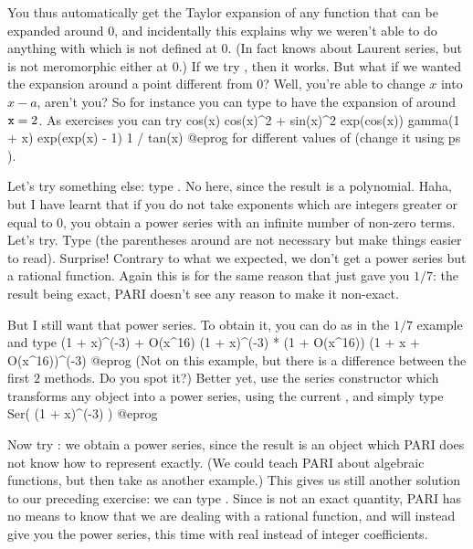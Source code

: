 You thus automatically get the Taylor expansion of any function that can be
expanded around $0$, and incidentally this explains why we weren't able to do
anything with  which is not defined at $0$. (In fact 
knows about Laurent series, but  is not meromorphic either at
$0$.) If we try , then it works. But what if we wanted the
expansion around a point different from 0? Well, you're able to change $x$
into $x-a$, aren't you? So for instance you can type  to have
the expansion of  around ${\tt x}=2$. As exercises you can try
\bprog
  cos(x)
  cos(x)^2 + sin(x)^2
  exp(cos(x))
  gamma(1 + x)
  exp(exp(x) - 1)
  1 / tan(x)
@eprog\noindent
for different values of  (change it using \b{ps}
).

Let's try something else: type . No  here, since
the result is a polynomial.  Haha, but I have learnt that if you do not take
exponents which are integers greater or equal to 0, you obtain a power series
with an infinite number of non-zero terms. Let's try.  Type
 (the parentheses around  are not necessary but
make things easier to read). Surprise! Contrary to what we expected, we don't
get a power series but a rational function. Again this is for the same reason
that  just gave you $1/7$: the result being exact, PARI doesn't see
any reason to make it non-exact.

But I still want that power series. To obtain it, you can do as in the $1/7$
example and type
\bprog
  (1 + x)^(-3) + O(x^16)
  (1 + x)^(-3) * (1 + O(x^16))
  (1 + x + O(x^16))^(-3)
@eprog\noindent
(Not on this example, but there is a difference between the first $2$
methods. Do you spot it?) Better yet, use the series constructor which
transforms any object into a power series, using the current
, and simply type
\bprog
  Ser( (1 + x)^(-3) )
@eprog

Now try : we obtain a power series, since the
result is an object which PARI does not know how to represent exactly. (We
could teach PARI about algebraic functions, but then take 
as another example.) This gives us still another solution to our preceding
exercise: we can type . Since  is not an exact
quantity, PARI has no means to know that we are dealing with a rational
function, and will instead give you the power series, this time with real
instead of integer coefficients.
\smallskip

